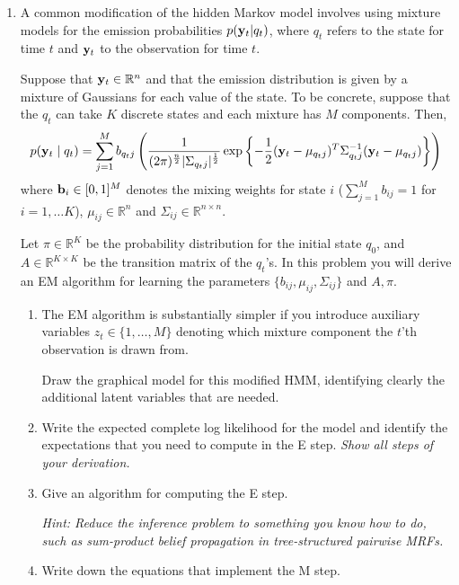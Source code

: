 \documentclass{article}
\newcommand{\yy}{{\bf y}}
\newcommand{\real}{\ensuremath{\mathbb{R}}}
\begin{document}
\begin{enumerate}
\begin{enumerate}
\end{enumerate}



\item 

A common modification of the hidden Markov model involves using mixture models for the
emission probabilities $p(\yy_t | q_t)$, where $q_t$ refers to the state for time $t$ and $\yy_t$ to the observation for time $t$.

Suppose that ${\bf y}_t \in \real^n$ and that the emission distribution is given by a mixture of Gaussians for each value of the state. To be concrete, suppose that the $q_t$ can take $K$ discrete states and each mixture has $M$ components. Then,
\[
p({\bf y}_t \mid q_t) = \sum_{j=1}^M b_{q_t j}
\left(\frac{1}{(2\pi)^{\frac{n}{2}}|\Sigma_{q_t j}|^{\frac{1}{2}}}
\exp\left\{-\frac{1}{2}({\bf y}_t-\mu_{q_t j})^T\Sigma_{q_t j}^{-1}({\bf y}_t-\mu_{q_t j})
\right\}\right)
\]
where ${\bf b}_i \in [0,1]^M$ denotes the mixing weights for state $i$ ($\sum_{j=1}^M b_{ij} = 1$ for $i=1,\ldots K$), $\mu_{ij} \in  \real^n$ and $\Sigma_{ij} \in  \real^{n\times n}$.

Let $\pi \in \real^K$ be the probability distribution for the initial state $q_0$,
and $A \in \real^{K \times K}$ be the transition matrix of the $q_t$'s.
In this problem you will derive an EM algorithm for learning the parameters $\{ b_{ij}, \mu_{ij}, \Sigma_{ij} \}$ and $A, \pi$.

\begin{enumerate}
\item The EM algorithm is substantially simpler if you introduce auxiliary variables $z_t\in \{1, \ldots, M\}$ denoting which mixture component the $t$'th observation is drawn from.

Draw the graphical model for this modified HMM, identifying
  clearly the additional latent variables that are needed.
\item Write the expected complete log likelihood for the model
  and identify the expectations that you need to compute in the E
  step. {\em Show all steps of your derivation.}

\item Give an algorithm for computing the E step.

{\em Hint: Reduce the inference problem to something you know how to do, such as sum-product belief propagation in tree-structured pairwise MRFs.}

\item Write down the equations that implement the M step.
\end{enumerate}


\end{enumerate}
\end{document}
